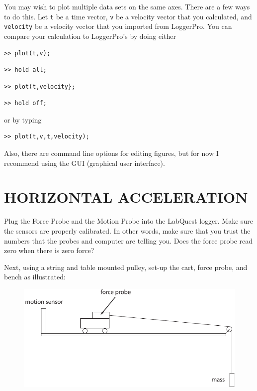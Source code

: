 \documentclass[11pt,letterpaper]{article}
\begin{document}
\begin{itemize}
You may wish to plot multiple data sets on the same axes. There are a few ways to do this. Let \verb+t+ be a time vector, \verb+v+ be a velocity vector that you calculated, and \verb+velocity+ be a velocity vector that you imported from LoggerPro. You can compare your calculation to LoggerPro's by doing either
\begin{verbatim}>> plot(t,v);\end{verbatim}
\begin{verbatim}>> hold all;\end{verbatim}
\begin{verbatim}>> plot(t,velocity};\end{verbatim}
\begin{verbatim}>> hold off;\end{verbatim}
or by typing
\begin{verbatim}>> plot(t,v,t,velocity);\end{verbatim}

Also, there are command line options for editing figures, but for now I recommend using the GUI (graphical user interface).

\end{itemize}

\section{HORIZONTAL ACCELERATION} 
Plug the Force Probe and the Motion Probe into the LabQuest logger. Make sure the sensors are properly calibrated. In other words, make sure that you trust the numbers that the probes and computer are telling you. Does the force probe read zero when there is zero force?

Next, using a string and table mounted pulley, set-up the cart, force probe, and bench as illustrated:

\begin{figure}[h]
\begin{center}
\includegraphics[]{./cart_and_pulley}
\end{center}
\end{figure}
\end{document}
